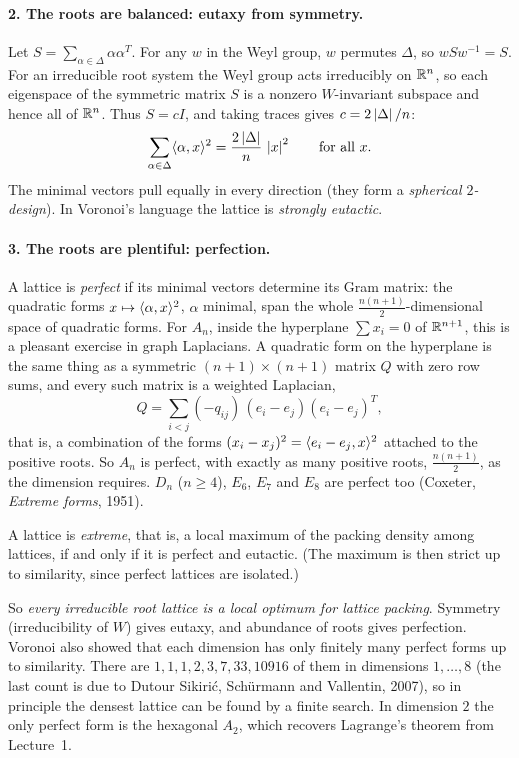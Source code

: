 \paragraph{2. The roots are balanced: eutaxy from symmetry.} Let
$S=\sum_{\alpha\in\Delta}\alpha\alpha^T$. For any $w$ in the Weyl group, $w$ permutes $\Delta$, so
$wSw^{-1}=S$. For an irreducible root system the Weyl group acts irreducibly on $\mathbb{R}^n$, so each
eigenspace of the symmetric matrix $S$ is a nonzero $W$-invariant subspace and hence all of $\mathbb{R}^n$.
Thus $S=cI$, and taking traces gives $c=2\left\lvert \Delta \right\rvert/n$:
\[
  \sum_{\alpha\in\Delta}\langle \alpha, x\rangle^2=\frac{2\left\lvert \Delta \right\rvert}{n}\,\left\lvert x \right\rvert^2\qquad\text{for all }x.
\]
The minimal vectors pull equally in every direction (they form a \emph{spherical $2$-design}). In
Voronoi's language the lattice is \emph{strongly eutactic}.

\paragraph{3. The roots are plentiful: perfection.} A lattice is \emph{perfect} if its minimal vectors
determine its Gram matrix: the quadratic forms $x\mapsto\langle \alpha, x\rangle^2$, $\alpha$ minimal, span the whole
$\frac{n(n+1)}2$-dimensional space of quadratic forms. For $A_n$, inside the hyperplane $\sum x_i=0$ of
$\mathbb{R}^{n+1}$, this is a pleasant exercise in graph Laplacians. A quadratic form on the hyperplane is the
same thing as a symmetric $(n+1)\times(n+1)$ matrix $Q$ with zero row sums, and every such matrix is a
weighted Laplacian,
\[
  Q=\sum_{i<j}(-q_{ij})\,(e_i-e_j)(e_i-e_j)^T,
\]
that is, a combination of the forms $(x_i-x_j)^2=\langle e_i-e_j, x\rangle^2$ attached to the positive roots. So
$A_n$ is perfect, with exactly as many positive roots, $\frac{n(n+1)}2$, as the dimension requires.
$D_n$ ($n\ge4$), $E_6$, $E_7$ and $E_8$ are perfect too (Coxeter, \emph{Extreme forms}, 1951).

\begin{theorem}[Voronoi 1908]\label{L04b:thm:voronoi}
A lattice is \emph{extreme}, that is, a local maximum of the packing density among lattices, if and
only if it is perfect and eutactic. (The maximum is then strict up to similarity, since perfect lattices
are isolated.)
\end{theorem}

\noindent So \emph{every irreducible root lattice is a local optimum for lattice packing}. Symmetry
(irreducibility of $W$) gives eutaxy, and abundance of roots gives perfection. Voronoi also showed that
each dimension has only finitely many perfect forms up to similarity. There are $1,1,1,2,3,7,33,10916$ of
them in dimensions $1,\dots,8$ (the last count is due to Dutour Sikiri\'c, Sch\"urmann and Vallentin,
2007), so in principle the densest lattice can be found by a finite search. In dimension $2$ the only
perfect form is the hexagonal $A_2$, which recovers Lagrange's theorem from Lecture~1.

